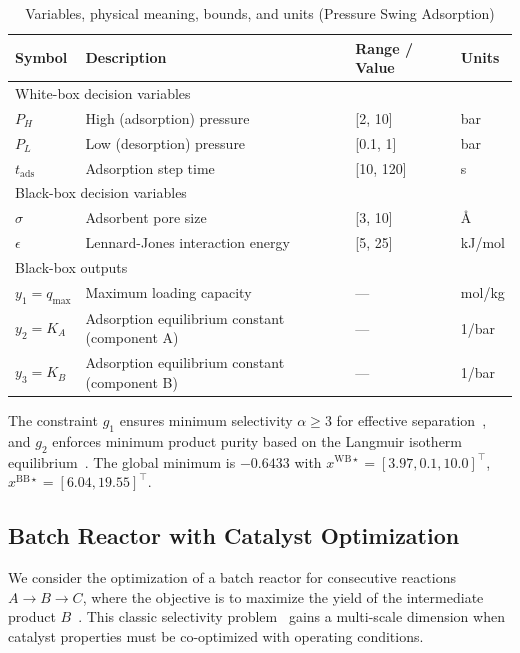 \documentclass[12pt,a4paper]{article}%
\theoremstyle{plain}%
\theoremstyle{remark}%
\theoremstyle{definition}%
\def\WB{\mathrm{WB}}
\def\BB{\mathrm{BB}}
\begin{document}
\begin{appendices}
\begin{table}[htbp]
\centering
\caption{Variables, physical meaning, bounds, and units (Pressure Swing Adsorption)}
\label{tab:psa_vars}
\begin{tabular}{@{}llll@{}}
\toprule
\textbf{Symbol} & \textbf{Description} & \textbf{Range / Value} & \textbf{Units} \\
\midrule
\multicolumn{4}{l}{White-box decision variables} \\
\midrule
$P_H$ & High (adsorption) pressure & [2, 10] & bar \\
$P_L$ & Low (desorption) pressure & [0.1, 1] & bar \\
$t_{\text{ads}}$ & Adsorption step time & [10, 120] & s \\
\midrule
\multicolumn{4}{l}{Black-box decision variables} \\
\midrule
$\sigma$ & Adsorbent pore size & [3, 10] & \AA \\
$\epsilon$ & Lennard-Jones interaction energy & [5, 25] & kJ/mol \\
\midrule
\multicolumn{4}{l}{Black-box outputs} \\
\midrule
$y_1 = q_{\max}$ & Maximum loading capacity & --- & mol/kg \\
$y_2 = K_A$ & Adsorption equilibrium constant (component A) & --- & 1/bar \\
$y_3 = K_B$ & Adsorption equilibrium constant (component B) & --- & 1/bar \\
\bottomrule
\end{tabular}
\end{table}

The constraint $g_1$ ensures minimum selectivity $\alpha \geq 3$ for effective separation~\cite{hasan2013cost,yang1987gas}, and $g_2$ enforces minimum product purity based on the Langmuir isotherm equilibrium~\cite{langmuir1918adsorption,ruthven1994psa}. The global minimum is $-0.6433$ with $x^{\WB\star} = [3.97, 0.1, 10.0]^\top$, $x^{\BB\star} = [6.04, 19.55]^\top$.

\subsection{Batch Reactor with Catalyst Optimization}\label{subsec:app_batch_reactor}

We consider the optimization of a batch reactor for consecutive reactions $A \to B \to C$, where the objective is to maximize the yield of the intermediate product $B$~\cite{parulekar1988yield}. This classic selectivity problem~\cite{luus1999towards} gains a multi-scale dimension when catalyst properties must be co-optimized with operating conditions.


\end{appendices}
\end{document}

